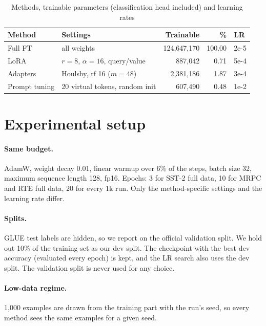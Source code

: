 \documentclass{nle}
\begin{document}
\begin{table}
  \caption{Methods, trainable parameters (classification head included) and learning rates}
  \label{tab:methods}
  \begin{minipage}{\textwidth}
    \begin{tabular}{llrrl}
    \hline\hline
    Method & Settings & Trainable & \% & LR \\
    \hline
    Full FT & all weights & 124,647,170 & 100.00 & 2e-5 \\
    LoRA & $r{=}8$, $\alpha{=}16$, query/value & 887,042 & 0.71 & 5e-4 \\
    Adapters & Houlsby, rf 16 ($m{=}48$) & 2,381,186 & 1.87 & 3e-4 \\
    Prompt tuning & 20 virtual tokens, random init & 607,490 & 0.48 & 1e-2 \\
    \hline\hline
    \end{tabular}
  \end{minipage}
\end{table}

\section{Experimental setup}

\paragraph{Same budget.} AdamW, weight decay 0.01, linear warmup over 6\% of the steps, batch size 32, maximum sequence length 128, fp16. Epochs: 3 for SST-2 full data, 10 for MRPC and RTE full data, 20 for every 1k run. Only the method-specific settings and the learning rate differ.

\paragraph{Splits.} GLUE test labels are hidden, so we report on the official validation split. We hold out 10\% of the training set as our dev split. The checkpoint with the best dev accuracy (evaluated every epoch) is kept, and the LR search also uses the dev split. The validation split is never used for any choice.

\paragraph{Low-data regime.} 1,000 examples are drawn from the training part with the run's seed, so every method sees the same examples for a given seed.
\end{document}

